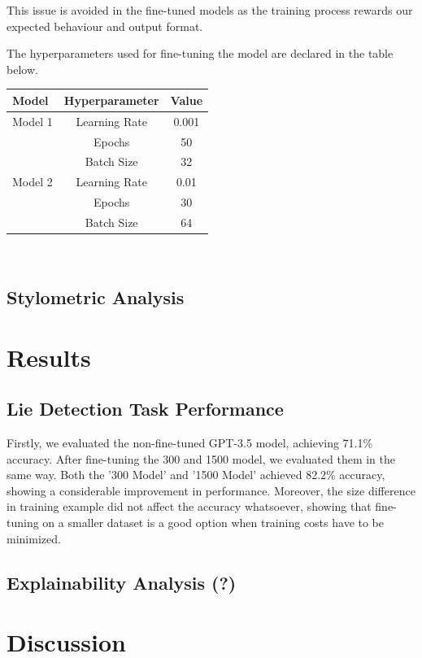 \documentclass[10pt,twocolumn,letterpaper]{article}
\begin{document}
This issue is avoided in the fine-tuned models as the training process
rewards our expected behaviour and output format.

The hyperparameters used for fine-tuning the model are declared in the table below. \\


\begin{tabular}{lcc}
    \toprule
    Model & Hyperparameter & Value \\
    \midrule
    Model 1 & Learning Rate & 0.001 \\
    & Epochs & 50 \\
    & Batch Size & 32 \\
    \midrule
    Model 2 & Learning Rate & 0.01 \\
    & Epochs & 30 \\
    & Batch Size & 64 \\
    \bottomrule
\end{tabular} \\

\subsection{Stylometric Analysis}

\section{Results}

\subsection{Lie Detection Task Performance}

Firstly, we evaluated the non-fine-tuned GPT-3.5 model, achieving 71.1\% accuracy.
After fine-tuning the 300 and 1500 model, we evaluated them in the same way.
Both the '300 Model' and '1500 Model' achieved 82.2\% accuracy, showing a considerable
improvement in performance. Moreover, the size difference in training example did not
affect the accuracy whatsoever, showing that fine-tuning on a smaller dataset is a good
option when training costs have to be minimized.

\subsection{Explainability Analysis (?)}

\section{Discussion}
\end{document}
